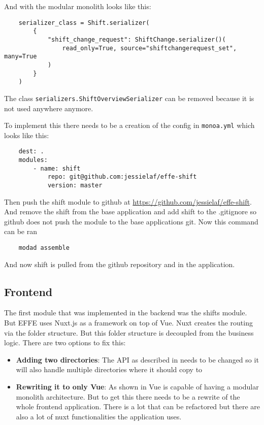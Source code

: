 And with the modular monolith looks like this:
\begin{verbatim}
    serializer_class = Shift.serializer(
        {
            "shift_change_request": ShiftChange.serializer()(
                read_only=True, source="shiftchangerequest_set", many=True
            )
        }
    )
\end{verbatim}

The class \texttt{serializers.ShiftOverviewSerializer} can be removed because it is not used anywhere anymore.

To implement this there needs to be a creation of the config in \texttt{monoa.yml} which looks like this:
\begin{verbatim}
    dest: .
    modules:
        - name: shift
            repo: git@github.com:jessielaf/effe-shift
            version: master
\end{verbatim}

Then push the shift module to github at \url{https://github.com/jessielaf/effe-shift}. And remove the shift from the base application and add shift to the .gitignore so github does not push the module to the base applications git. Now this command can be ran
\begin{verbatim}
    modad assemble
\end{verbatim}

And now shift is pulled from the github repository and in the application.

\subsection{Frontend}

The first module that was implemented in the backend was the shifts module. But EFFE uses Nuxt.js as a framework on top of Vue. Nuxt creates the routing via the folder structure. But this folder structure is decoupled from the business logic. There are two options to fix this:

\begin{itemize}
    \item \textbf{Adding two directories}: The API as described in  needs to be changed so it will also handle multiple directories where it should copy to
    \item \textbf{Rewriting it to only Vue}: As shown in  Vue is capable of having a modular monolith architecture. But to get this there needs to be a rewrite of the whole frontend application. There is a lot that can be refactored but there are also a lot of nuxt functionalities the application uses.
\end{itemize}


